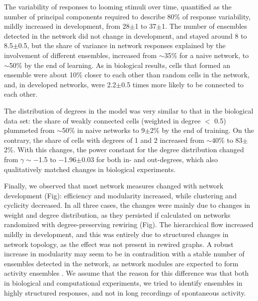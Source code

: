 \documentclass{article}
\begin{document}
The variability of responses to looming stimuli over time, quantified as the number of principal components required to describe 80\% of response variability, mildly increased in development, from 28$\pm$1 to 37$\pm$1. The number of ensembles detected in the network did not change in development, and stayed around 8 to 8.5$\pm$0.5, but the share of variance in network responses explained by the involvement of different ensembles, increased from $\sim$35\% for a naive network, to $\sim$50\% by the end of learning. As in biological results, cells that formed an ensemble were about 10\% closer to each other than random cells in the network, and, in developed networks, were 2.2$\pm$0.5 times more likely to be connected to each other.

The distribution of degrees in the model was very similar to that in the biological data set: the share of weakly connected cells (weighted in degree $<$ 0.5) plummeted from $\sim$50\% in naive networks to 9$\pm$2\% by the end of training. On the contrary, the share of cells with degrees of 1 and 2 increased from $\sim$40\% to 83$\pm$2\%. With this changes, the power constant for the degree distribution changed from $\gamma \sim -$1.5 to $-$1.96$\pm$0.03 for both in- and out-degrees, which also qualitatively matched changes in biological experiments.

Finally, we observed that most network measures changed with network development (Fig): efficiency and modularity increased, while clustering and cyclicity decreased. In all three cases, the changes were mainly due to changes in weight and degree distribution, as they persisted if calculated on networks randomized with degree-preserving rewiring (Fig). The hierarchical flow increased mildly in development, and this was entirely due to structured changes in network topology, as the effect was not present in rewired graphs. A robust increase in modularity may seem to be in contradition with a stable number of ensembles detected in the network, as network modules are expected to form activity ensembles \citep{triplett2018emergence}. We assume that the reason for this difference was that both in biological and computational experiments, we tried to identify ensembles in highly structured responses, and not in long recordings of spontaneous activity.
\end{document}
